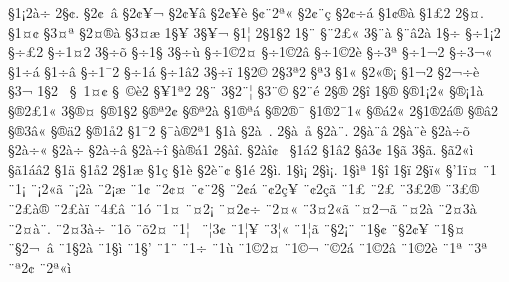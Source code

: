 {^^a71^^a12^^e0^^f7
2^^a7^^a2.
^^a72^^a2^^a0^^e2
^^a72^^a2^^a5^^ac
^^a72^^a2^^a5^^e2
^^a72^^a2^^a5^^e8
^^a7^^a2^^a82^^aa^^ab
^^a72^^a2^^a8^^e7
^^a72^^a2^^f7^^e1
^^a71^^a2^^ae^^e0
^^a71^^a32
2^^a7^^a4.
^^a71^^a4^^a2
^^a73^^a4^^aa
^^a72^^a4^^ae^^e0
^^a73^^a4^^e6
1^^a7^^a5
3^^a7^^a5^^ac^^ad
^^a71^^a6
2^^a71^^a72
1^^a7^^a8
^^a7^^a82^^a3^^ab
3^^a7^^a8^^e0
^^a7^^a8^^e22^^e0
1^^a7^^f7
^^a7^^f71^^a12
^^a7^^f7^^a32
^^a7^^f71^^a42
3^^a7^^f7^^f5
^^a7^^f71^^a7
3^^a7^^f7^^f9
^^a7^^f71^^a92^^a4
^^a7^^f71^^a92^^e2
^^a7^^f71^^a92^^e8
^^a7^^f73^^aa
^^a7^^f71^^ac2
^^a7^^f73^^ac^^ab
^^a71^^f7^^ad^^e1
^^a71^^f7^^ad^^e2
^^a7^^f71^^af2
^^a7^^f71^^e1
^^a7^^f71^^e22
3^^a7^^f7^^ef
1^^a72^^a9
2^^a73^^aa2
^^a7^^aa3^^ad
^^a71^^ab
^^a72^^ab^^ae^^a1
^^a71^^ac2
^^a72^^ac^^f7^^e8
^^a73^^ac^^ad
1^^a72^^ad^^a0
^^a7^^ad^^a01^^a4^^a2
^^a7^^ad^^a0^^a9^^e82
^^a7^^ad^^a51^^aa2
2^^a7^^ad^^a8
3^^a72^^ad^^a8^^a6
^^a73^^ad^^a8^^a9
^^a72^^ad^^a8^^e9
2^^a7^^ad^^ae
2^^a7^^ad^^ee
1^^a7^^ae
^^a7^^ae1^^a12^^ab
^^a7^^ae^^a11^^e0
^^a7^^ae2^^a31^^ab
3^^a7^^ae^^a4
^^a7^^ae1^^a72
^^a7^^ae^^aa2^^a2
^^a7^^ae^^aa2^^e0
^^a71^^ae^^aa^^e1
^^a7^^ae2^^ae^^af
^^a71^^ae2^^af1^^ab
^^a7^^ae^^e12^^ab
2^^a71^^ae2^^e1^^ae
^^a7^^ae^^e22
^^a7^^ae3^^e2^^ab
^^a7^^ae^^e42
^^a7^^ae1^^e52
^^a71^^af2
^^a7^^af^^e0^^ae2^^aa1
^^a71^^e0
^^a72^^e0^^a0.
2^^a7^^e0^^a0^^e5
^^a72^^e0^^a8.
2^^a7^^e0^^a8^^e2
2^^a7^^e0^^a8^^e8
^^a72^^e0^^f7^^f5
^^a72^^e0^^f7^^ab
^^a72^^e0^^f7^^ad
^^a72^^e0^^f7^^e2
^^a72^^e0^^f7^^ee
^^a7^^e0^^ae^^e11
2^^a7^^e0^^ee.
^^a72^^e0^^ee^^a2^^a0^^ad
^^a71^^e12
^^a71^^e22
^^a7^^e23^^a2
1^^a7^^e3
3^^a7^^e3.
^^a7^^e32^^ab^^ec
^^a7^^e31^^e1^^e22
^^a71^^e4
^^a71^^e52
2^^a71^^e6
^^a71^^e7
^^a71^^e8
^^a72^^e8^^a8^^a2
^^a71^^e9
2^^a7^^ec.
1^^a7^^ec^^a1
2^^a7^^ec^^a1.
1^^a7^^ec^^aa
1^^a7^^ee
1^^a7^^ef
2^^a7^^ef^^ab
^^a7'1^^ef^^a4
^^a81^^a0
^^a81^^a1
^^a8^^a12^^ab^^e3
^^a8^^a12^^e0
^^a82^^a1^^e6
^^a81^^a2
^^a82^^a2^^a4
^^a8^^a2^^a82^^a7
^^a82^^a2^^e1
^^a8^^a22^^e7^^a5
^^a8^^a22^^e7^^e3
^^a81^^a3
^^a82^^a3^^ad
^^a83^^a32^^ad^^ae
^^a83^^a3^^ae
^^a82^^a3^^e0^^ae
^^a82^^a3^^e0^^ef
^^a84^^a3^^e2
^^a81^^f3
^^a81^^a4
^^a8^^a42^^a1
^^a8^^a42^^a2^^f7
^^a82^^a4^^ab
^^a83^^a42^^ab^^e3
^^a8^^a42^^ac^^e3
^^a8^^a42^^e0
^^a82^^a43^^e0^^a0
^^a82^^a4^^e0^^a8.
^^a82^^a43^^e0^^f7
^^a81^^f5
^^a8^^f52^^a4
^^a81^^a6^^a0
^^a8^^a63^^a2
^^a81^^a6^^a5
^^a83^^a6^^ab
^^a81^^a6^^e3
^^a8^^a72^^a1^^a8
^^a81^^a7^^a2
^^a8^^a72^^a2^^a5
^^a81^^a7^^a4
^^a8^^a72^^ac^^a0^^e2
^^a81^^a72^^e0
^^a81^^a7^^ec
^^a81^^a7'
^^a81^^a8
^^a81^^f7
^^a81^^f9
^^a81^^a92^^a4
^^a81^^a9^^ac
^^a8^^a92^^e1
^^a81^^a92^^e2
^^a81^^a92^^e8
^^a81^^aa
^^a83^^aa^^a0
^^a8^^aa2^^a2
^^a82^^aa^^ab^^ec
}
